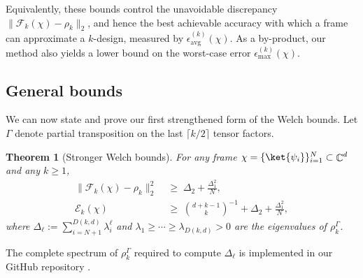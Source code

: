 \documentclass[aps,twocolumn,pra,superscriptaddress,nofootinbib]{revtex4-2}
\newtheorem{thm}{Theorem}
\DeclareMathOperator{\C}{\mathbb{C}} %
\begin{document}
Equivalently, these bounds control the unavoidable discrepancy
$\|\mathcal F_k(\chi)-\rho_k\|_2$, and hence the best achievable accuracy with which a frame
can approximate a $k$-design, measured by $\epsilon_{\mathrm{avg}}^{(k)}(\chi)$.
As a by-product, our method also yields a lower bound on the worst-case error
$\epsilon_{\mathrm{max}}^{(k)}(\chi)$.

\subsection{General bounds}

We can now state and prove our first strengthened form of the Welch bounds.
Let $\mathsf{\Gamma}$ denote partial transposition on the last $\lceil k/2\rceil$ tensor factors. 

\begin{thm}[Stronger Welch bounds]\label{Th:StrongerWB}
For any frame $\chi=\{\ket{\psi_i}\}_{i=1}^N\subset\C^d$ and any $k\ge 1$,
\begin{align}
\|\mathcal F_k(\chi)-\rho_k\|_2^2 &\;\ge\; \Delta_2 + \frac{\Delta_1^2}{N}, \label{Eq:ApproximateDesignIneq}\\
\mathcal E_k(\chi) &\;\ge\; \binom{d+k-1}{k}^{-1} + \Delta_2 + \frac{\Delta_1^2}{N}, \label{Eq:StrongherWB}
\end{align}
where $\Delta_\ell:=\sum_{i=N+1}^{D(k,d)}\lambda_i^\ell$ and
$\lambda_1\ge\cdots\ge \lambda_{D(k,d)}>0$ are the eigenvalues of $\rho_k^{\mathsf{\Gamma}}$.
\end{thm}
The complete spectrum of $\rho_k^{\Gamma}$ required to compute $\Delta_\ell$ is implemented in our GitHub repository \cite{Code}.
\end{document}
